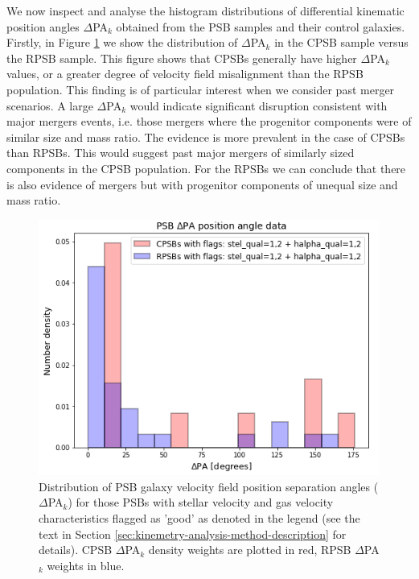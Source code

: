 We now inspect and analyse the histogram distributions of differential kinematic position angles $\Delta$PA$_{k}$ obtained from the PSB samples and their control galaxies. Firstly, in Figure \ref{fig:deltaPAdistribution} we show the distribution of $\Delta$PA$_{k}$ in the CPSB sample versus the RPSB sample. This figure shows that CPSBs generally have higher $\Delta$PA$_{k}$ values, or a greater degree of velocity field misalignment than the RPSB population. This finding is of particular interest when we consider past merger scenarios. A large $\Delta$PA$_{k}$ would indicate significant disruption consistent with major mergers events, i.e. those mergers where the progenitor components were of similar size and mass ratio. The evidence is more prevalent in the case of CPSBs than RPSBs. This would suggest past major mergers of similarly sized components in the CPSB population. For the RPSBs we can conclude that there is also evidence of mergers but with progenitor components of unequal size and mass ratio.

\begin{figure}
    \centering
    \includegraphics[width=\columnwidth]{images/JupyterPlots/Dist-Delta-PA-All-GoodFlags.png}
    \caption[Distribution of PSB stellar and gas velocity field position angles]{Distribution of PSB galaxy velocity field position separation angles ($\Delta$PA$_{k}$) for those PSBs with stellar velocity and gas velocity characteristics flagged as 'good' as denoted in the legend (see the text in Section \ref{sec:kinemetry-analysis-method-description} for details). CPSB $\Delta$PA$_{k}$ density weights are plotted in red, RPSB $\Delta$PA$_{k}$ weights in blue.}
    \label{fig:deltaPAdistribution}
\end{figure}

